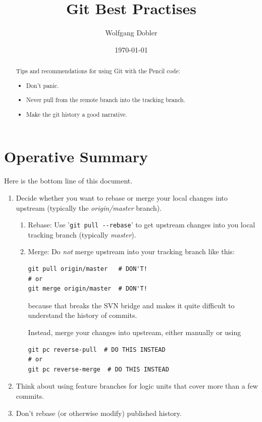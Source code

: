 \documentclass[12pt,pdftex]{article}
\author{Wolfgang Dobler}
\date{\today}
\title{Git Best Practises}
\begin{document}
\maketitle
\tableofcontents

\thispagestyle{empty}

\begin{abstract}
\noindent%
Tips and recommendations for using Git with the Pencil code:
\begin{itemize}
\item Don't panic.
\item Never pull from the remote branch into the tracking branch.
\item Make the git history a good narrative.
\end{itemize}
\end{abstract}


\section{Operative Summary}
\label{sec-1}

Here is the bottom line of this document.

\begin{enumerate}
\item Decide whether you want to rebase or merge your local changes into
upstream (typically the \emph{origin/master} branch).

\begin{enumerate}
\item Rebase: Use '\texttt{git pull -{}-rebase}' to get upstream changes into you
local tracking branch (typically \emph{master}).

\item Merge: Do \emph{not} merge upstream into your tracking branch like this:
\lstset{frame=single,basicstyle=\ttfamily\footnotesize,language=sh,label= ,caption= ,captionpos=b,numbers=none}
\begin{lstlisting}
git pull origin/master   # DON'T!
# or
git merge origin/master  # DON'T!
\end{lstlisting}
because that breaks the SVN bridge and makes it quite difficult to
understand the history of commits.

Instead, merge your changes into upstream, either manually or
using
\lstset{frame=single,basicstyle=\ttfamily\footnotesize,language=sh,label= ,caption= ,captionpos=b,numbers=none}
\begin{lstlisting}
git pc reverse-pull  # DO THIS INSTEAD
# or
git pc reverse-merge  # DO THIS INSTEAD
\end{lstlisting}
\end{enumerate}

\item Think about using feature branches for logic units that cover more
than a few commits.

\item Don't rebase (or otherwise modify) published history.
\end{enumerate}
\end{document}
